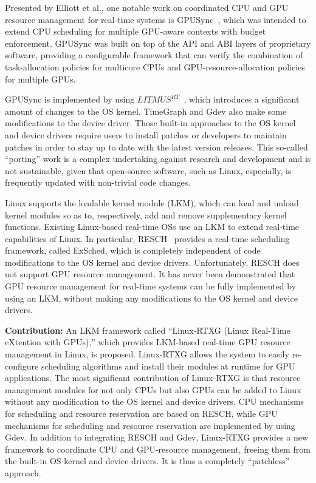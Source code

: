 Presented by Elliott et al., one notable work on coordinated CPU and GPU resource management for real-time systems is GPUSync~\cite{elliott:gpusync13,elliott:explor14}, which was intended to extend CPU scheduling for multiple GPU-aware contexts with budget enforcement. GPUSync was built on top of the API and ABI layers of proprietary software, providing a configurable framework that can verify the combination of task-allocation policies for multicore CPUs and GPU-resource-allocation policies for multiple GPUs.

GPUSync is implemented by using $LITMUS^{RT}$~\cite{litmus}, which introduces a significant amount of changes to the OS kernel. TimeGraph and Gdev also make some modifications to the device driver. Those built-in approaches to the OS kernel and device drivers require users to install patches or developers to maintain patches in order to stay up to date with the latest version releases. This so-called ``porting'' work is a complex undertaking against research and development and is not sustainable, given that open-source software, such as Linux, especially, is frequently updated with non-trivial code changes.

Linux supports the loadable kernel module (LKM), which can load and unload kernel modules so as to, respectively, add and remove supplementary kernel functions. Existing Linux-based real-time OSs use an LKM to extend real-time capabilities of Linux. In particular, RESCH~\cite{kato2009loadable, asberg2012exsched} provides a real-time scheduling framework, called ExSched, which is completely independent of code modifications to the OS kernel and device drivers. Unfortunately, RESCH does not support GPU resource management. It has never been demonstrated that GPU resource management for real-time systems can be fully implemented by using an LKM, without making any modifications to the OS kernel and device drivers.

\textbf{Contribution:} An LKM framework called ``Linux-RTXG (Linux Real-Time eXtention with GPUs),'' which provides LKM-based real-time GPU resource management in Linux, is proposed. Linux-RTXG allows the system to easily re-configure scheduling algorithms and install their modules at runtime for GPU applications. The most significant contribution of Linux-RTXG is that resource management modules for not only CPUs but also GPUs can be added to Linux without any modification to the OS kernel and device drivers. CPU mechanisms for scheduling and resource reservation are based on RESCH, while GPU mechanisms for scheduling and resource reservation are implemented by using Gdev. In addition to integrating RESCH and Gdev, Linux-RTXG provides a new framework to coordinate CPU and GPU-resource management, freeing them from the built-in OS kernel and device drivers. It is thus a completely ``patchless'' approach.

